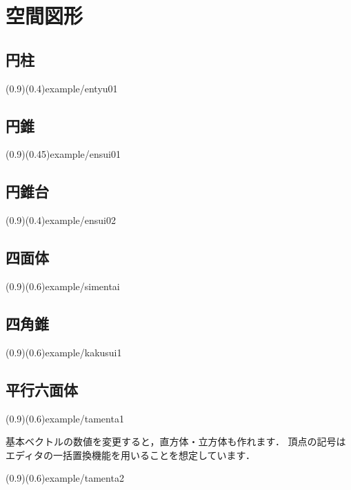 \section{空間図形}
\subsection{円柱}

\showexample[円柱](0.9)(0.4){example/entyu01}

\subsection{円錐}

\showexample[円錐](0.9)(0.45){example/ensui01}

\subsection{円錐台}

\showexample[円錐台](0.9)(0.4){example/ensui02}

\subsection{四面体}

\showexample[四面体](0.9)(0.6){example/simentai}

\subsection{四角錐}

\showexample[四角錐](0.9)(0.6){example/kakusui1}

\subsection{平行六面体}

\showexample[平行六面体](0.9)(0.6){example/tamenta1}

基本ベクトルの数値を変更すると，直方体・立方体も作れます．
頂点の記号はエディタの一括置換機能を用いることを想定しています．

\showexample[平行六面体](0.9)(0.6){example/tamenta2}
